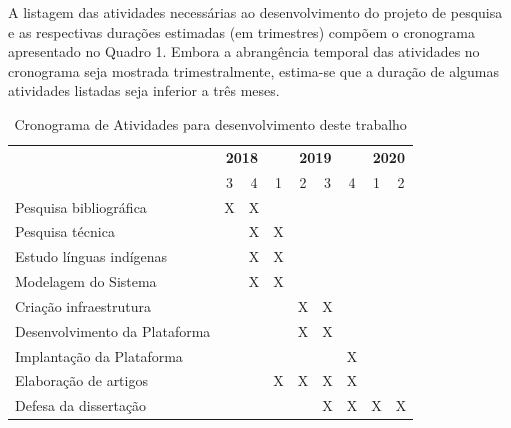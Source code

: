 \documentclass[journal]{IEEEtran}
\begin{document}
A listagem das atividades necessárias ao desenvolvimento do projeto de pesquisa e as respectivas durações estimadas (em trimestres) compõem o cronograma apresentado no Quadro 1. Embora a abrangência temporal das atividades no cronograma seja mostrada trimestralmente, estima-se que a duração de algumas atividades listadas seja inferior a três meses.

\begin{table}[!ht]
	\centering
	\caption{Cronograma de Atividades para desenvolvimento deste trabalho}
	\begin{tabular}{|l|c|c|c|c|c|c|c|c|} \hline
	 \multirow{2}{*}{}& \multicolumn{2}{c|}{{\bf2018}}& \multicolumn{4}{c|}{{\bf2019}}& \multicolumn{2}{c|}{{\bf2020}}
	 \\ \cline{2-9} 
                       				              &  3  &  4  &  1  &  2  &  3  &  4  &  1  &  2 \\ \hline
		\scriptsize{Pesquisa bibliográfica} 	  &  X  &  X  &     &     &     &     &     &    \\ \hline
		\scriptsize{Pesquisa técnica}	          &     &  X  &  X  &     &     &     &     &    \\ \hline
		\scriptsize{Estudo línguas indígenas}	  &     &  X  &  X  &     &     &     &     &    \\ \hline
		\scriptsize{Modelagem do Sistema}	      &     &  X  &  X  &     &     &     &     &    \\ \hline
	    \scriptsize{Criação infraestrutura}       &     &     &     &  X  &  X  &     &     &    \\ \hline
	    \scriptsize{Desenvolvimento da Plataforma}&     &     &     &  X  &  X  &     &     &    \\ \hline
	    \scriptsize{Implantação da Plataforma}    &     &     &     &     &     &  X  &     &    \\ \hline
	    \scriptsize{Elaboração de artigos}        &     &     &  X  &  X  &  X  &  X  &     &    \\ \hline
	    \scriptsize{Defesa da dissertação}        &     &     &     &     &  X  &  X  &  X  &  X \\ \hline
	\end{tabular}
	\label{t_cronograma}
\end{table}
\end{document}
